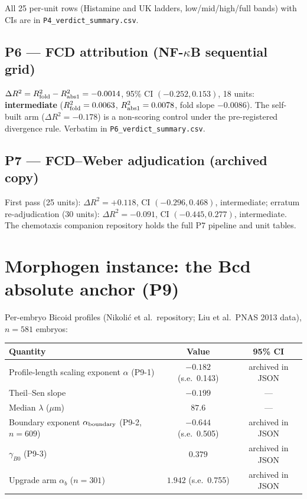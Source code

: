 \documentclass[11pt]{article}
\begin{document}
All 25 per-unit rows (Histamine and UK ladders, low/mid/high/full bands)
with CIs are in \texttt{P4\_verdict\_summary.csv}.

\subsection{P6 --- FCD attribution (NF-$\kappa$B sequential grid)}

$\Delta R^2 = R^2_{\rm fold} - R^2_{\rm abs1} = -0.0014$, 95\% CI
$(-0.252, 0.153)$, 18 units: \textbf{intermediate}
($R^2_{\rm fold}=0.0063$, $R^2_{\rm abs1}=0.0078$, fold slope $-0.0086$).
The self-built arm ($\Delta R^2 = -0.178$) is a non-scoring control under
the pre-registered divergence rule. Verbatim in
\texttt{P6\_verdict\_summary.csv}.

\subsection{P7 --- FCD--Weber adjudication (archived copy)}

First pass (25 units): $\Delta R^2 = +0.118$, CI $(-0.296, 0.468)$,
intermediate; erratum re-adjudication (30 units): $\Delta R^2 = -0.091$,
CI $(-0.445, 0.277)$, intermediate. The chemotaxis companion repository
holds the full P7 pipeline and unit tables.

\section{Morphogen instance: the Bcd absolute anchor (P9)}

Per-embryo Bicoid profiles (Nikoli\'c et al.\ repository; Liu et al.\
PNAS 2013 data), $n=581$ embryos:

\begin{table}[h]
\centering\small
\begin{tabular}{lcc}
\toprule
Quantity & Value & 95\% CI \\
\midrule
Profile-length scaling exponent $\alpha$ (P9-1) & $-0.182$ (s.e.\ 0.143) & archived in JSON \\
Theil--Sen slope & $-0.199$ & --- \\
Median $\lambda$ ($\mu$m) & $87.6$ & --- \\
Boundary exponent $\alpha_{\rm boundary}$ (P9-2, $n=609$) & $-0.644$ (s.e.\ 0.505) & archived in JSON \\
$\gamma_{B0}$ (P9-3) & $0.379$ & archived in JSON \\
Upgrade arm $\alpha_b$ ($n=301$) & $1.942$ (s.e.\ 0.755) & archived in JSON \\
\bottomrule
\end{tabular}
\end{table}
\end{document}
